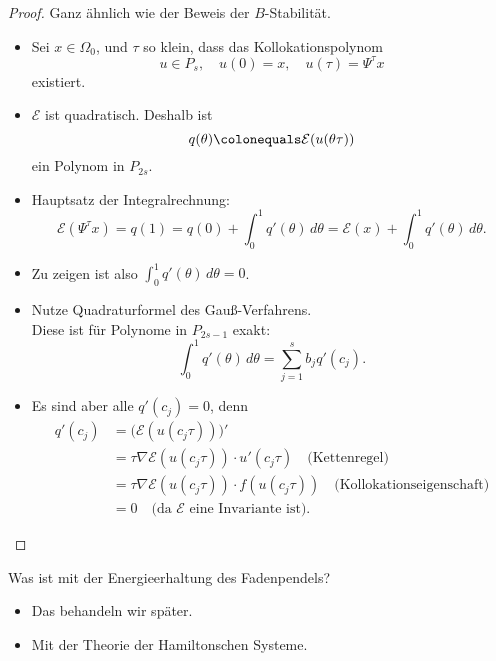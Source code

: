 \begin{proof}
	Ganz ähnlich wie der Beweis der $B$-Stabilität.
	\begin{itemize}
		\item  Sei $x\in\Omega_0$, und $\tau$ so klein, dass das Kollokationspolynom
		\begin{equation*}
			u\in P_s,\quad u(0)=x,\quad u(\tau) = \Psi^\tau x
		\end{equation*}
		existiert.
		\item $\mathcal E$ ist quadratisch. Deshalb ist
		\begin{equation*}
			q(\theta) \colonequals \mathcal E(u(\theta\tau))
		\end{equation*}
		ein Polynom in $P_{2s}$.
		\item Hauptsatz der Integralrechnung:
		\begin{equation*}
			\mathcal E(\Psi^\tau x) = q(1) = q(0) + \int_0^1q'(\theta)\,d\theta = \mathcal E(x) + \int_0^1q'(\theta)\,d\theta . 
		\end{equation*}
		\item Zu zeigen ist also $\int_0^1q'(\theta)\,d\theta =0$.
		\item Nutze Quadraturformel des Gauß-Verfahrens.\\
		Diese ist für Polynome in $P_{2s-1}$ exakt:
		\begin{equation*}
			\int_0^1q'(\theta)\,d\theta = \sum_{j=1}^s b_j q'(c_j).
		\end{equation*}
		\item Es sind aber alle $q'(c_j)=0$, denn
		\begin{align*}
		q'(c_j) &= \big(\mathcal E(u(c_j\tau))\big)'\\
		   &= \tau\nabla\mathcal E(u(c_j\tau))\cdot u'(c_j\tau)\quad\text{(Kettenregel)} \\
		   &= \tau\nabla\mathcal E(u(c_j\tau))\cdot f(u(c_j\tau))\quad\text{(Kollokationseigenschaft)}\\
		   &= 0\quad\text{(da $\mathcal E$ eine Invariante ist)}.
		\end{align*}
	\end{itemize}
\end{proof}
Was ist mit der Energieerhaltung des Fadenpendels?
\begin{itemize}
	\item Das behandeln wir später.
	\item Mit der Theorie der Hamiltonschen Systeme.
\end{itemize}